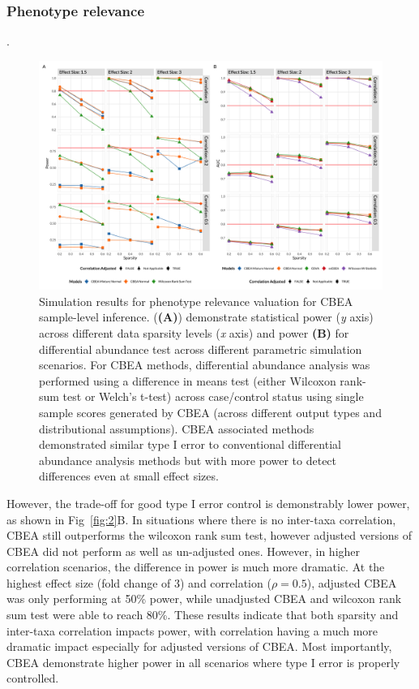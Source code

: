 \documentclass{article}
\begin{document}
\subsubsection{Phenotype relevance}. 

\begin{figure}[!h]
    \centering
    \includegraphics[width = \textwidth]{figures/sim_ss_pwr.png}
    \caption{Simulation results for phenotype relevance valuation for CBEA sample-level inference. (\textbf{(A)}) demonstrate statistical power (\emph{y} axis) across different data sparsity levels (\emph{x} axis) and power \textbf{(B)} for differential abundance test across different parametric simulation scenarios. For CBEA methods, differential abundance analysis was performed using a difference in means test (either Wilcoxon rank-sum test or Welch's t-test) across case/control status using single sample scores generated by CBEA (across different output types and distributional assumptions). CBEA associated methods demonstrated similar type I error to conventional differential abundance analysis methods but with more power to detect differences even at small effect sizes.} 
    \label{fig:s3}
\end{figure}

However, the trade-off for good type I error control is demonstrably lower power, as shown in Fig~\ref{fig:2}B. In situations where there is no inter-taxa correlation, CBEA still outperforms the wilcoxon rank sum test, however adjusted versions of CBEA did not perform as well as un-adjusted ones. However, in higher correlation scenarios, the difference in power is much more dramatic. At the highest effect size (fold change of 3) and correlation ($\rho = 0.5$), adjusted CBEA was only performing at 50\% power, while unadjusted CBEA and wilcoxon rank sum test were able to reach 80\%. These results indicate that both sparsity and inter-taxa correlation impacts power, with correlation having a much more dramatic impact especially for adjusted versions of CBEA. Most importantly, CBEA demonstrate higher power in all scenarios where type I error is properly controlled.    
\end{document}
